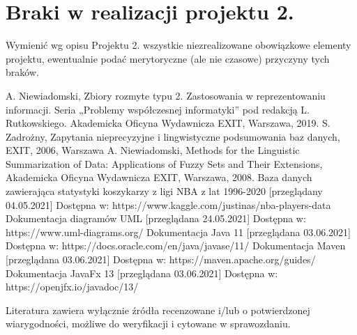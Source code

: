 \documentclass{classrep}
\begin{document}


\section{Braki w realizacji projektu 2.}
Wymienić wg opisu Projektu 2. wszystkie niezrealizowane obowiązkowe elementy projektu, ewentualnie
podać merytoryczne (ale nie czasowe) przyczyny tych braków. 


\begin{thebibliography}{99}
  A. Niewiadomski, Zbiory rozmyte typu 2. Zastosowania w reprezentowaniu informacji.  Seria „Problemy współczesnej informatyki” pod redakcją L. Rutkowskiego. Akademicka Oficyna Wydawnicza EXIT, Warszawa, 2019.
 S. Zadrożny, Zapytania nieprecyzyjne i lingwistyczne podsumowania baz danych, EXIT, 2006, Warszawa
 A. Niewiadomski, Methods for the Linguistic Summarization of Data: Applications of Fuzzy Sets and Their Extensions, Akademicka Oficyna Wydawnicza EXIT, Warszawa, 2008.
 Baza danych zawierająca statystyki koszykarzy z ligi NBA z lat 1996-2020 [przeglądany 04.05.2021] Dostępna w:
https://www.kaggle.com/justinas/nba-players-data
 Dokumentacja diagramów UML [przeglądana 24.05.2021] Dostępna w:
https://www.uml-diagrams.org/
 Dokumentacja Java 11 [przeglądana 03.06.2021] Dostępna w: https://docs.oracle.com/en/java/javase/11/
 Dokumentacja Maven [przeglądana 03.06.2021] Dostępna w: https://maven.apache.org/guides/
 Dokumentacja JavaFx 13 [przeglądana 03.06.2021] Dostępna w: https://openjfx.io/javadoc/13/
\end{thebibliography}

Literatura zawiera wyłącznie źródła recenzowane i/lub o potwierdzonej wiarygodności,
możliwe do weryfikacji i cytowane w sprawozdaniu. 
\end{document}
